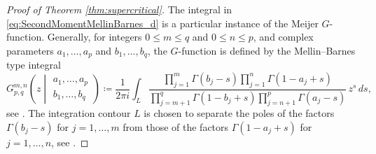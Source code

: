 \documentclass[11pt,a4paper]{article}
\theoremstyle{plain}
\theoremstyle{definition}
\theoremstyle{remark}
\begin{document}
\begin{proof}[Proof of Theorem \ref{thm:supercritical}]
The integral in \eqref{eq:SecondMomentMellinBarnes_d} is a particular instance of the Meijer $G$-function. Generally, for integers $0 \le m \le q$ and $0 \le n \le p$, and complex parameters $a_1, \dots, a_p$ and $b_1, \dots, b_q$, the $G$-function is defined by the Mellin--Barnes type integral 
\begin{equation}\label{eq:DefGFunction}
	G_{p,q}^{m,n} \left( z \middle| \begin{matrix} a_1, \dots, a_p \\ b_1, \dots, b_q \end{matrix} \right)
	\coloneqq \frac{1}{2\pi i} \int_L
	\frac{\prod_{j=1}^m \Gamma(b_j - s)\prod_{j=1}^n \Gamma(1-a_j+s)}{
		\prod_{j=m+1}^q \Gamma(1-b_j+s)\prod_{j=n+1}^p \Gamma(a_j-s)}
	\, z^s \, ds,
\end{equation}
see \cite[Equation (1.1.1)]{MathaiSaxena}. The integration contour $L$ is chosen to separate the poles of the factors $\Gamma(b_j-s)$ for $j=1,\dots,m$ from those of the factors $\Gamma(1-a_j+s)$ for $j=1,\dots,n$, see \cite[page 2]{MathaiSaxena}. 


\end{proof}
\end{document}
